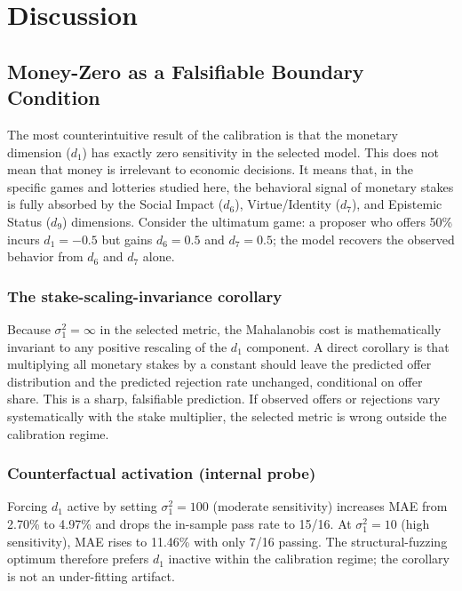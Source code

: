 \documentclass[journal]{IEEEtran}
\begin{document}
\section{Discussion}
\label{sec:discussion}

\subsection{Money-Zero as a Falsifiable Boundary Condition}
\label{sec:andersen}

The most counterintuitive result of the calibration is that the monetary dimension ($d_1$) has exactly zero sensitivity in the selected model.
This does not mean that money is irrelevant to economic decisions.
It means that, in the specific games and lotteries studied here, the behavioral signal of monetary stakes is fully absorbed by the Social Impact ($d_6$), Virtue/Identity ($d_7$), and Epistemic Status ($d_9$) dimensions.
Consider the ultimatum game: a proposer who offers 50\% incurs $d_1=-0.5$ but gains $d_6=0.5$ and $d_7=0.5$; the model recovers the observed behavior from $d_6$ and $d_7$ alone.

\subsubsection{The stake-scaling-invariance corollary}
Because $\sigma_1^2=\infty$ in the selected metric, the Mahalanobis cost is mathematically invariant to any positive rescaling of the $d_1$ component.
A direct corollary is that multiplying all monetary stakes by a constant should leave the predicted offer distribution and the predicted rejection rate unchanged, conditional on offer share.
This is a sharp, falsifiable prediction.
If observed offers or rejections vary systematically with the stake multiplier, the selected metric is wrong outside the calibration regime.

\subsubsection{Counterfactual activation (internal probe)}
Forcing $d_1$ active by setting $\sigma_1^2=100$ (moderate sensitivity) increases MAE from 2.70\% to 4.97\% and drops the in-sample pass rate to 15/16.
At $\sigma_1^2=10$ (high sensitivity), MAE rises to 11.46\% with only 7/16 passing.
The structural-fuzzing optimum therefore prefers $d_1$ inactive within the calibration regime; the corollary is not an under-fitting artifact.
\end{document}
